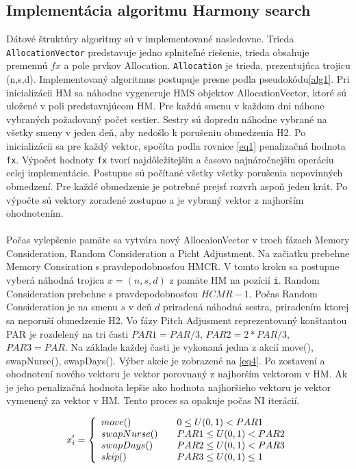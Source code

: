 \documentclass[a4paper, 14pt]{article}
\begin{document}
\subsection{Implementácia algoritmu Harmony search}
Dátové štruktúry algoritmy sú v implementované nasledovne. Trieda \texttt{AllocationVector} predstavuje jedno splniteľné riešenie, trieda obsahuje premennú $fx$ a pole prvkov Allocation. \texttt{Allocation} je trieda, prezentujúca trojicu (n,s,d).
Implementovaný algoritmus postupuje presne podla pseudokódu\ref{alg1}. Pri inicializácii HM sa náhodne vygeneruje HMS objektov AllocationVector, ktoré sú uložené v poli predstavujúcom HM. Pre každú smenu v každom dni náhone vybraných požadovaný počet sestier. Sestry sú dopredu náhodne vybrané na všetky smeny v jeden deň, aby nedošlo k porušeniu obmedzenia H2. Po inicializácii sa pre každý vektor, spočíta podla rovnice \ref{eq1} penalizačná hodnota \texttt{fx}. Výpočet hodnoty \texttt{fx} tvorí najdôležitejšiu a časovo najnáročnejšiu operáciu celej implementácie. Postupne sú počítané všetky všetky porušenia nepovinných obmedzení. Pre každé obmedzenie je potrebné prejsť rozvrh aspoň jeden krát. Po výpočte sú vektory zoradené zostupne a je vybraný vektor z najhorším ohodnotením.\\
\\
Počas vylepšenie pamäte sa vytvára nový AllocaionVector v troch fázach Memory Consideration, Random Consideration a Picht Adjustment. Na začiatku prebehne Memory Consiration s pravdepodobnosťou HMCR. V tomto kroku sa postupne vyberá náhodná trojica $x = (n,s,d)$ z pamäte HM na pozícií \texttt{i}. Random Consideration prebehne s pravdepodobnosťou $HCMR - 1$. Počas Random Consideration je na smenu $s$ v deň $d$ priradená náhodná sestra, priradením ktorej sa neporuší obmedzenie H2. Vo fázy Pitch Adjusment reprezentovaný konštantou PAR je rozdelený na tri časti $PAR1 = PAR/3$, $PAR2 = 2*PAR/3$, $PAR3 = PAR$.  Na základe každej časti je vykonaná jedna z akcií move(), swapNurse(), swapDays(). Výber akcie je zobrazené na \ref{eq4}. Po zostavení a ohodnotení nového vektoru je vektor porovnaný z najhorším vektorom v HM. Ak je jeho penalizačná hodnota lepšie ako hodnota najhoršieho vektoru je vektor vymenený za vektor v HM. Tento proces sa opakuje počas NI iterácií. 

\begin{center}
\begin{eqnarray}
\label{eq4}
x'_i = \left\{ 
\begin{array}{l l}
  move() & \quad \mbox  {$0  \leq U(0,1) < PAR1$}\\
  swapNurse() & \quad \mbox{$PAR1 \leq U(0,1) < PAR2$}\\
  swapDays() & \quad \mbox{$PAR2 \leq U(0,1) < PAR3$}\\
  skip() & \quad \mbox{$PAR3 \leq U(0,1) \leq 1$}\\
\end{array} \right. 
\end{eqnarray}
\end{center}  
\end{document}
